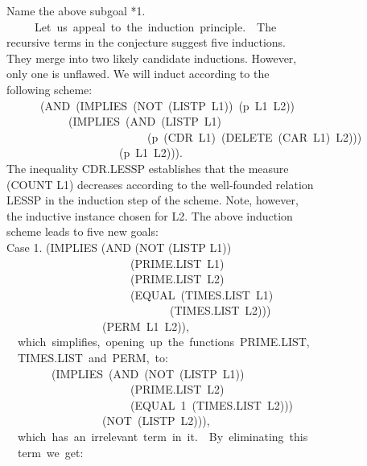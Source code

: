 \documentclass[10pt]{book}
\newenvironment{pubasis}{\begin{flushleft}}{\end{flushleft}}
\begin{document}
\begin{pubasis}
Name the above subgoal *1.\\

~~~~~Let~us~appeal~to~the~induction~principle.~~The\\
recursive terms in the conjecture suggest five inductions.\\
They merge into two likely candidate inductions.  However,\\
only one is unflawed.  We will induct according to the\\
following scheme:\\
~~~~~~(AND~(IMPLIES~(NOT~(LISTP~L1))~(p~L1~L2))\\
~~~~~~~~~~~(IMPLIES~(AND~(LISTP~L1)\\
~~~~~~~~~~~~~~~~~~~~~~~~~(p~(CDR~L1)~(DELETE~(CAR~L1)~L2)))\\
~~~~~~~~~~~~~~~~~~~~(p~L1~L2))).\\
The inequality CDR.LESSP establishes that the measure\\
(COUNT L1) decreases according to the well-founded relation\\
LESSP in the induction step of the scheme.  Note, however,\\
the inductive instance chosen for L2.  The above induction\\
scheme leads to five new goals:\\

Case 1.	(IMPLIES (AND (NOT (LISTP L1))\\
~~~~~~~~~~~~~~~~~~~~~~(PRIME.LIST~L1)\\
~~~~~~~~~~~~~~~~~~~~~~(PRIME.LIST~L2)\\
~~~~~~~~~~~~~~~~~~~~~~(EQUAL~(TIMES.LIST~L1)\\
~~~~~~~~~~~~~~~~~~~~~~~~~~~~~(TIMES.LIST~L2)))\\
~~~~~~~~~~~~~~~~~(PERM~L1~L2)),\\

~~which~simplifies,~opening~up~the~functions~PRIME.LIST,\\
~~TIMES.LIST~and~PERM,~to:\\

~~~~~~~~(IMPLIES~(AND~(NOT~(LISTP~L1))\\
~~~~~~~~~~~~~~~~~~~~~~(PRIME.LIST~L2)\\
~~~~~~~~~~~~~~~~~~~~~~(EQUAL~1~(TIMES.LIST~L2)))\\
~~~~~~~~~~~~~~~~~(NOT~(LISTP~L2))),\\

~~which~has~an~irrelevant~term~in~it.~~By~eliminating~this\\
~~term~we~get:\\


\end{pubasis}
\end{document}
